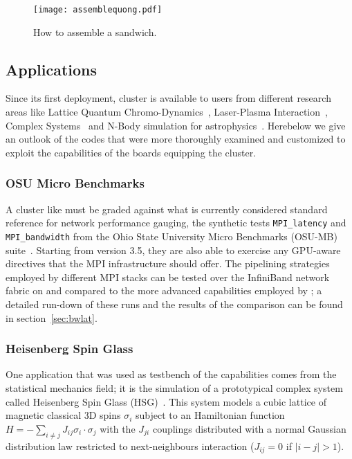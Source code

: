 \begin{figure}[!hbt]
  \centering
  \texttt{[image: assemblequong.pdf]}
  \caption{How to assemble a \quong sandwich.}
  \label{fig:quongsandwich}
\end{figure}
\FloatBarrier

\subsection{Applications}
\label{sec:applic}
Since its first deployment, \quong cluster is available to users from
different research areas like Lattice Quantum
Chromo-Dynamics~\cite{D'Elia:2012:zw}, Laser-Plasma
Interaction~\cite{Rossi:pic}, Complex Systems~\cite{Berganza:2012:xy}
and N-Body simulation for astrophysics~\cite{2012arXiv1207.2367C}.
Herebelow we give an outlook of the codes that were more thoroughly
examined and customized to exploit the \PtoP capabilities of the
\apenetp boards equipping the \quong cluster.

\subsubsection{OSU Micro Benchmarks}
A cluster like \quong must be graded against what is currently
considered standard reference for network performance gauging, \ie the
synthetic tests \texttt{MPI\_latency} and \texttt{MPI\_bandwidth} from
the Ohio State University Micro Benchmarks (OSU-MB)
suite~\cite{Traff:2012:OMB-GPU}.
Starting from version 3.5, they are also able to exercise any
GPU-aware directives that the MPI infrastructure should offer.
The pipelining strategies employed by different MPI stacks can be
tested over the InfiniBand network fabric on \quong and compared to
the more advanced \PtoP capabilities employed by \apenetp; a detailed
run-down of these runs and the results of the comparison can be found
in section~\ref{sec:bwlat}.

\subsubsection{Heisenberg Spin Glass}
One application that was used as testbench of the \apenetp
capabilities comes from the statistical mechanics field; it is the
simulation of a prototypical complex system called Heisenberg Spin
Glass (HSG)~\cite{Bernaschi20121416}.
This system models a cubic lattice of magnetic classical 3D spins
$\sigma_{i}$ subject to an Hamiltonian function $H=-\sum_{i \neq j}
J_{ij} \sigma_{i} \cdot \sigma_{j}$ with the $J_{ji}$ couplings
distributed with a normal Gaussian distribution law restricted to
next-neighbours interaction ($J_{ij}=0$ if $|i-j|>1$).

